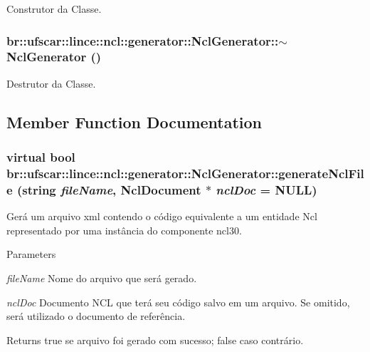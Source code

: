 Construtor da Classe. 

\hypertarget{classbr_1_1ufscar_1_1lince_1_1ncl_1_1generator_1_1NclGenerator_a95e37288a7d455edd79d9eb95bb3e733}{
\subsubsection[{$\sim$NclGenerator}]{\setlength{\rightskip}{0pt plus 5cm}br::ufscar::lince::ncl::generator::NclGenerator::$\sim$NclGenerator ()}}
\label{classbr_1_1ufscar_1_1lince_1_1ncl_1_1generator_1_1NclGenerator_a95e37288a7d455edd79d9eb95bb3e733}


Destrutor da Classe. 



\subsection{Member Function Documentation}
\hypertarget{classbr_1_1ufscar_1_1lince_1_1ncl_1_1generator_1_1NclGenerator_a2817848f6498deda5d5e22cf784907a0}{
\subsubsection[{generateNclFile}]{\setlength{\rightskip}{0pt plus 5cm}virtual bool br::ufscar::lince::ncl::generator::NclGenerator::generateNclFile (string {\em fileName}, \/  NclDocument $\ast$ {\em nclDoc} = {\ttfamily NULL})}}
\label{classbr_1_1ufscar_1_1lince_1_1ncl_1_1generator_1_1NclGenerator_a2817848f6498deda5d5e22cf784907a0}


Gerá um arquivo xml contendo o código equivalente a um entidade Ncl representado por uma instância do componente ncl30. 


\begin{DoxyParams}{Parameters}
\item[{\em fileName}]Nome do arquivo que será gerado. \item[{\em nclDoc}]Documento NCL que terá seu código salvo em um arquivo. Se omitido, será utilizado o documento de referência. \end{DoxyParams}
\begin{DoxyReturn}{Returns}
true se arquivo foi gerado com sucesso; false caso contrário. 
\end{DoxyReturn}

